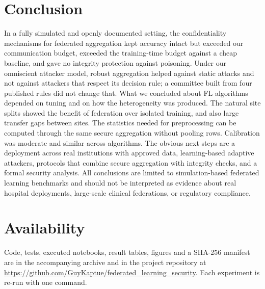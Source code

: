 \documentclass[conference]{IEEEtran}
\begin{document}
\section{Conclusion}
In a fully simulated and openly documented setting, the confidentiality mechanisms for federated aggregation kept accuracy intact but exceeded our communication budget, exceeded the training-time budget against a cheap baseline, and gave no integrity protection against poisoning. Under our omniscient attacker model, robust aggregation helped against static attacks and not against attackers that respect its decision rule; a committee built from four published rules did not change that. What we concluded about FL algorithms depended on tuning and on how the heterogeneity was produced. The natural site splits showed the benefit of federation over isolated training, and also large transfer gaps between sites. The statistics needed for preprocessing can be computed through the same secure aggregation without pooling rows. Calibration was moderate and similar across algorithms. The obvious next steps are a deployment across real institutions with approved data, learning-based adaptive attackers, protocols that combine secure aggregation with integrity checks, and a formal security analysis. All conclusions are limited to simulation-based federated learning benchmarks and should not be interpreted as evidence about real hospital deployments, large-scale clinical federations, or regulatory compliance.
\section*{Availability}
Code, tests, executed notebooks, result tables, figures and a SHA-256 manifest are in the accompanying archive and in the project repository at \url{https://github.com/GuyKaptue/federated_learning_security}. Each experiment is re-run with one command.


\end{document}
